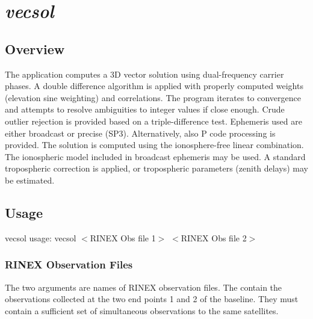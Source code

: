 %
%


\section{\emph{vecsol}}
\subsection{Overview}
The application computes a 3D vector solution using dual-frequency carrier phases. A double difference
algorithm is applied with properly computed weights (elevation sine weighting) and correlations. The program
iterates to convergence and attempts to resolve ambiguities to integer values if close enough. Crude outlier rejection
is provided based on a triple-difference test. Ephemeris used are either broadcast or precise (SP3). Alternatively, also P code
processing is provided.
The solution is computed using the ionosphere-free linear combination. The ionospheric model included in broadcast ephemeris may be used. A standard tropospheric correction is applied, or tropospheric parameters (zenith delays) may be estimated.

\subsection{Usage}
\begin{\outputsize}
vecsol usage: vecsol $<$RINEX Obs file 1$>$ $<$RINEX Obs file 2$>$
\end{\outputsize}

\subsubsection{RINEX Observation Files}
The two arguments are names of RINEX observation files. The contain the observations collected at the two end points 1 and 2 of the baseline.
They must contain a sufficient set of simultaneous observations to the same satellites.

